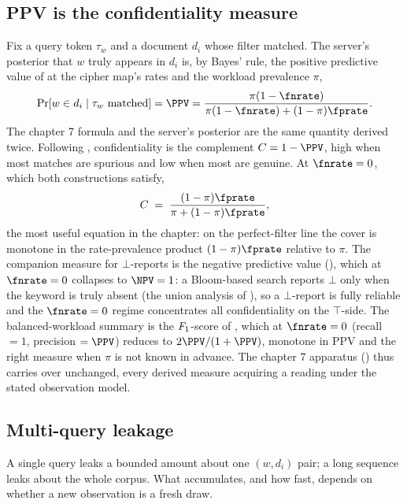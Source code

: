\subsection*{PPV is the confidentiality measure}

Fix a query token $\tau_w$ and a document $d_i$ whose filter matched. The
server's posterior that $w$ truly appears in $d_i$ is, by Bayes' rule,
the positive predictive value of  at the cipher map's rates
and the workload prevalence $\pi$,
\[
  \Pr[w \in d_i \mid \tau_w \text{ matched}]
  = \PPV = \frac{\pi(1 - \fnrate)}{\pi(1 - \fnrate) + (1 - \pi)\fprate}.
\]
The chapter 7 formula and the server's posterior are the same
quantity derived twice. Following
, confidentiality is the complement
$C = 1 - \PPV$, high when most matches are spurious and low when most are
genuine. At $\fnrate = 0$, which both constructions satisfy,
\[
  C \;=\; \frac{(1 - \pi)\fprate}{\pi + (1 - \pi)\fprate},
\]
the most useful equation in the chapter: on the perfect-filter
line the cover is monotone in the rate-prevalence product $(1 -
\pi)\fprate$ relative to $\pi$. The companion measure for $\bot$-reports
is the negative predictive value (), which at $\fnrate = 0$
collapses to $\NPV = 1$: a Bloom-based search reports $\bot$ only when the
keyword is truly absent (the union analysis of ),
so a $\bot$-report is fully reliable and the $\fnrate = 0$ regime
concentrates all confidentiality on the $\top$-side. The balanced-workload
summary is the $F_1$-score of , which at $\fnrate = 0$
(recall $= 1$, precision $= \PPV$) reduces to $2\PPV/(1 + \PPV)$, monotone
in PPV and the right measure when $\pi$ is not known in advance. The chapter 7 apparatus () thus carries over
unchanged, every derived measure acquiring a reading under the stated
observation model.

\subsection*{Multi-query leakage}

A single query leaks a bounded amount about one $(w, d_i)$ pair; a long
sequence leaks about the whole corpus. What accumulates, and how fast,
depends on whether a new observation is a fresh draw.

